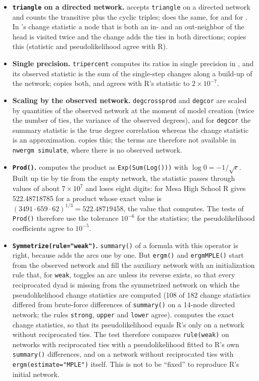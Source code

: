 \begin{itemize}
  \item \textbf{\texttt{triangle} on a directed network.} \ergm{} accepts \texttt{triangle} on a directed network and counts the transitive plus the cyclic triples; \nwergm{} does the same, for  and for . In \ergm{}'s change statistic a node that is both an in- and an out-neighbor of the head is visited twice and the change adds the ties in both directions; \nwergm{} copies this (statistic and pseudolikelihood agree with R).
  \item \textbf{Single precision.} \texttt{tripercent} computes its ratios in single precision in \ergm{}, and its observed statistic is the sum of the single-step changes along a build-up of the network; \nwergm{} copies both, and agrees with R's statistic to $2\times10^{-7}$.
  \item \textbf{Scaling by the observed network.} \texttt{degcrossprod} and \texttt{degcor} are scaled by quantities of the observed network at the moment of model creation (twice the number of ties, the variance of the observed degrees), and for \texttt{degcor} the summary statistic is the true degree correlation whereas the change statistic is an approximation. \nwergm{} copies this; the terms are therefore not available in \texttt{nwergm simulate}, where there is no observed network.
  \item \textbf{\texttt{Prod()}.} \ergm{} computes the product as \texttt{Exp(Sum(Log()))} with $\log0=-1/\sqrt{\epsilon}$. Built up tie by tie from the empty network, the statistic passes through values of about $7\times10^{7}$ and loses eight digits: for Mesa High School R gives 522.48718785 for a product whose exact value is $(3491\cdot659\cdot62)^{1/3}=522.48719458$, the value that \nwergm{} computes. The tests of \texttt{Prod()} therefore use the tolerance $10^{-6}$ for the statistics; the pseudolikelihood coefficients agree to $10^{-5}$.
  \item \textbf{\texttt{Symmetrize(rule="weak")}.} \texttt{summary()} of a formula with this operator is right, because \ergm{} adds the arcs one by one. But \texttt{ergm()} and \texttt{ergmMPLE()} start from the observed network and fill the auxiliary network with an initialization rule that, for \texttt{weak}, toggles an arc unless its reverse exists, so that every reciprocated dyad is missing from the symmetrized network on which the pseudolikelihood change statistics are computed (108 of 182 change statistics differed from brute-force differences of \texttt{summary()} on a 14-node directed network; the rules \texttt{strong}, \texttt{upper} and \texttt{lower} agree). \nwergm{} computes the exact change statistics, so that its pseudolikelihood equals R's only on a network without reciprocated ties. The test therefore compares \texttt{rule(weak)} on networks with reciprocated ties with a pseudolikelihood fitted to R's own \texttt{summary()} differences, and on a network without reciprocated ties with \texttt{ergm(estimate="MPLE")} itself. This is not to be ``fixed'' to reproduce R's initial network.

\end{itemize}
